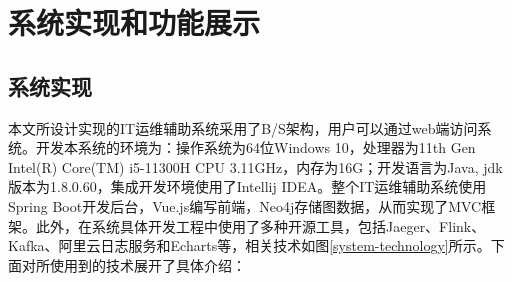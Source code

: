 \section{系统实现和功能展示}
\subsection{系统实现}

本文所设计实现的IT运维辅助系统采用了B/S架构，用户可以通过web端访问系统。开发本系统的环境为：操作系统为64位Windows 10，处理器为11th Gen Intel(R) Core(TM) i5-11300H CPU 3.11GHz，内存为16G；开发语言为Java, jdk版本为1.8.0.60，集成开发环境使用了Intellij IDEA。整个IT运维辅助系统使用Spring Boot开发后台，Vue.js编写前端，Neo4j存储图数据，从而实现了MVC框架。此外，在系统具体开发工程中使用了多种开源工具，包括Jaeger、Flink、Kafka、阿里云日志服务和Echarts等，相关技术如图\ref{system-technology}所示。下面对所使用到的技术展开了具体介绍：
